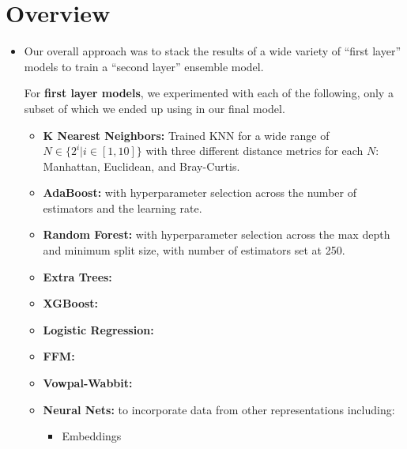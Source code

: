 \section{Overview}
\medskip
\begin{itemize}

    \item {}

        Our overall approach was to stack the results of a wide variety of ``first layer'' models to train a ``second layer'' ensemble model.

        For \textbf{first layer models}, we experimented with each of the following, only a subset of which we ended up using in our final model.
        \begin{itemize}
            \item \textbf{K Nearest Neighbors:} Trained KNN for a wide range of $N \in \{2^i | i \in [1,10]\}$ with three different distance metrics for each $N$: Manhattan, Euclidean, and Bray-Curtis.
            \item \textbf{AdaBoost:} with hyperparameter selection across the number of estimators and the learning rate.
            \item \textbf{Random Forest:} with hyperparameter selection across the max depth and minimum split size, with number of estimators set at 250.
            \item \textbf{Extra Trees:} %
            \item \textbf{XGBoost:} %
            \item \textbf{Logistic Regression:} %
            \item \textbf{FFM:} %
            \item \textbf{Vowpal-Wabbit:} %
            \item \textbf{Neural Nets:} to incorporate data from other representations including:
                \begin{itemize}
                    \item Embeddings %
                \end{itemize}
        \end{itemize}


\end{itemize}
